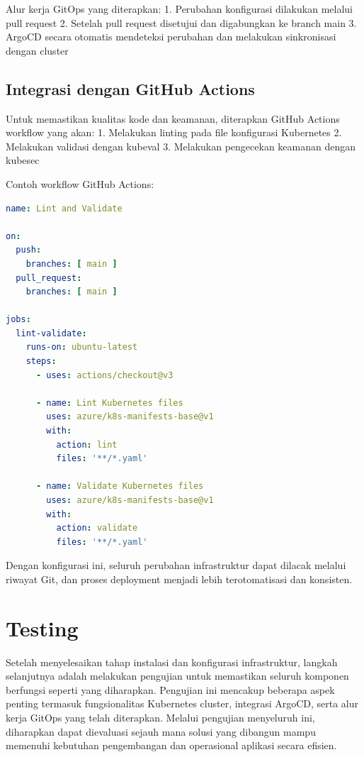Alur kerja GitOps yang diterapkan:
1. Perubahan konfigurasi dilakukan melalui pull request
2. Setelah pull request disetujui dan digabungkan ke branch main
3. ArgoCD secara otomatis mendeteksi perubahan dan melakukan sinkronisasi dengan cluster

\subsection{Integrasi dengan GitHub Actions}
Untuk memastikan kualitas kode dan keamanan, diterapkan GitHub Actions workflow yang akan:
1. Melakukan linting pada file konfigurasi Kubernetes
2. Melakukan validasi dengan kubeval
3. Melakukan pengecekan keamanan dengan kubesec

Contoh workflow GitHub Actions:

\begin{lstlisting}[language=yaml, basicstyle=\footnotesize\ttfamily]
name: Lint and Validate

on:
  push:
    branches: [ main ]
  pull_request:
    branches: [ main ]

jobs:
  lint-validate:
    runs-on: ubuntu-latest
    steps:
      - uses: actions/checkout@v3
      
      - name: Lint Kubernetes files
        uses: azure/k8s-manifests-base@v1
        with:
          action: lint
          files: '**/*.yaml'

      - name: Validate Kubernetes files
        uses: azure/k8s-manifests-base@v1
        with:
          action: validate
          files: '**/*.yaml'
\end{lstlisting}

Dengan konfigurasi ini, seluruh perubahan infrastruktur dapat dilacak melalui riwayat Git, dan proses deployment menjadi lebih terotomatisasi dan konsisten.

\section{Testing}
Setelah menyelesaikan tahap instalasi dan konfigurasi infrastruktur, langkah selanjutnya adalah melakukan pengujian untuk memastikan seluruh komponen berfungsi seperti yang diharapkan. Pengujian ini mencakup beberapa aspek penting termasuk fungsionalitas Kubernetes cluster, integrasi ArgoCD, serta alur kerja GitOps yang telah diterapkan. Melalui pengujian menyeluruh ini, diharapkan dapat dievaluasi sejauh mana solusi yang dibangun mampu memenuhi kebutuhan pengembangan dan operasional aplikasi secara efisien.

